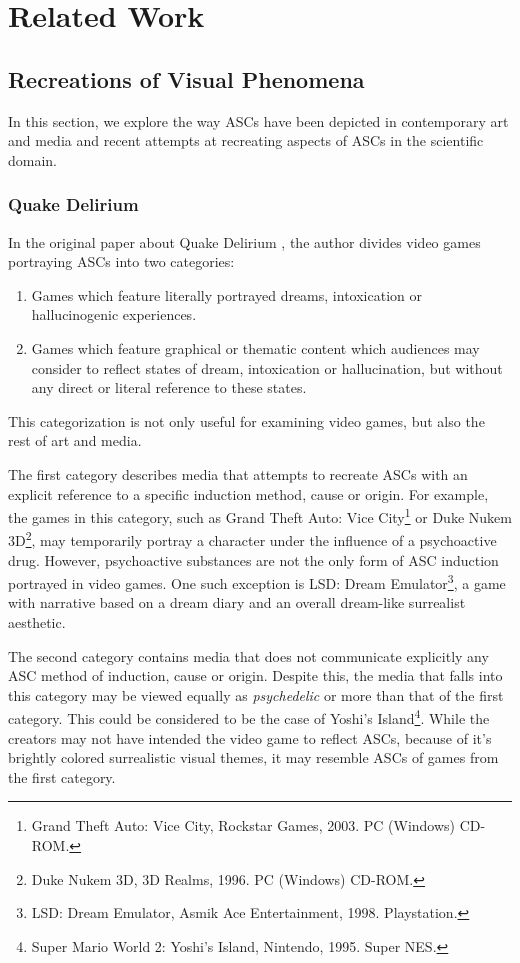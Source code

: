 \section{Related Work}

\subsection{Recreations of Visual Phenomena}
In this section, we explore the way \acp{ASC} have been depicted in contemporary art and media and recent attempts at recreating aspects of \acp{ASC} in the scientific domain.

\subsubsection{Quake Delirium}
In the original paper about Quake Delirium \autocite{weinel2011quake}, the author divides video games portraying \acp{ASC} into two categories:

\begin{enumerate}
    \item Games which feature literally portrayed dreams, intoxication or hallucinogenic experiences.
    \item Games which feature graphical or thematic content which audiences may consider to reflect states of dream, intoxication or hallucination, but without any direct or literal reference to these states.
\end{enumerate}

This categorization is not only useful for examining video games, but also the rest of art and media.

The first category describes media that attempts to recreate \acp{ASC} with an explicit reference to a specific induction method, cause or origin. For example, the games in this category, such as {Grand Theft Auto: Vice City}\footnote{Grand Theft Auto: Vice City, Rockstar Games, 2003. PC (Windows) CD-ROM.} or {Duke Nukem 3D}\footnote{Duke Nukem 3D, 3D Realms, 1996. PC (Windows)
CD-ROM.}, may temporarily portray a character under the influence of a psychoactive drug. However, psychoactive substances are not the only form of \ac{ASC} induction portrayed in video games. One such exception is {LSD: Dream Emulator}\footnote{LSD: Dream Emulator, Asmik Ace Entertainment, 1998. Playstation.}, a game with narrative based on a dream diary and an overall dream-like surrealist aesthetic.

The second category contains media that does not communicate explicitly any \ac{ASC} method of induction, cause or origin. Despite this, the media that falls into this category may be viewed equally as \textit{psychedelic} or more than that of the first category. This could be considered to be the case of {Yoshi's Island}\footnote{Super Mario World 2: Yoshi’s Island, Nintendo, 1995. Super NES.}. While the creators may not have intended the video game to reflect \acp{ASC}, because of it's brightly colored surrealistic visual themes, it may resemble \acp{ASC} of games from the first category.

